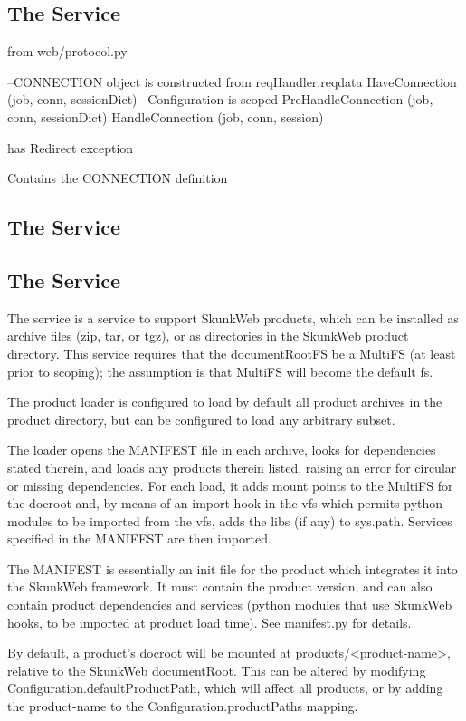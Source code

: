 \documentclass{manual}
\begin{document}
\subsection{The  Service}

from web/protocol.py

--CONNECTION object is constructed from reqHandler.reqdata
HaveConnection (job, conn, sessionDict)
--Configuration is scoped
PreHandleConnection (job, conn, sessionDict)
HandleConnection (job, conn, session)

has Redirect exception

Contains the CONNECTION definition

\subsection{The  Service}

\subsection{The  Service}
The  service is a service to support SkunkWeb
products, which can be installed as archive files (zip, tar, or tgz),
or as directories in the SkunkWeb product directory.  This service
requires that the documentRootFS be a MultiFS (at least prior to
scoping); the assumption is that MultiFS will become the default fs.

The product loader is configured to load by default all product
archives in the product directory, but can be configured to load any
arbitrary subset.

The loader opens the MANIFEST file in each archive, looks for
dependencies stated therein, and loads any products therein listed,
raising an error for circular or missing dependencies.  For each load,
it adds mount points to the MultiFS for the docroot and, by means of
an import hook in the vfs which permits python modules to be imported
from the vfs, adds the libs (if any) to sys.path.  Services specified
in the MANIFEST are then imported.

The MANIFEST is essentially an init file for the product which
integrates it into the SkunkWeb framework.  It must contain the
product version, and can also contain product dependencies and
services (python modules that use SkunkWeb hooks, to be imported at
product load time).  See manifest.py for details.

By default, a product's docroot will be mounted at
products/<product-name>, relative to the SkunkWeb documentRoot.  This
can be altered by modifying Configuration.defaultProductPath, which
will affect all products, or by adding the product-name to the
Configuration.productPaths mapping.
\end{document}
